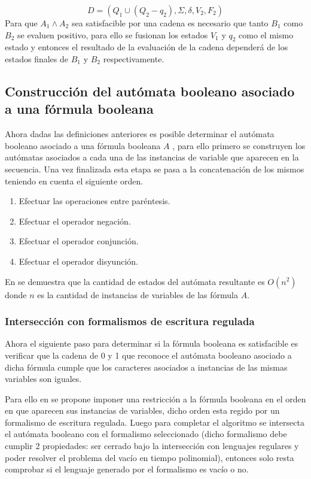 $$
      D=(Q_1\cup (Q_2-q_2),\Sigma,\delta,V_2, F_2)
$$
Para que $A_1 \wedge A_2$ sea satisfacible por una cadena es necesario que tanto $B_1$ como $B_2$ se evaluen positivo, para
ello se fusionan los estados $V_1$ y $q_2$ como el mismo estado y entonces el resultado de la evaluación de la cadena dependerá
de los estados finales de $B_1$ y $B_2$ respectivamente.

\subsection{Construcción del autómata booleano asociado a una fórmula booleana}

Ahora dadas las definiciones anteriores es posible determinar el autómata booleano asociado a una fórmula booleana $A$ \cite{aCFSAT},
para ello primero se construyen los autómatas asociados a cada una de las instancias de variable que
aparecen en la secuencia. Una vez finalizada esta etapa se pasa a la concatenación de los
mismos teniendo en cuenta el siguiente orden.

\begin{enumerate}
      \item Efectuar las operaciones entre paréntesis.
      \item  Efectuar el operador negación.
      \item  Efectuar el operador conjunción.
      \item  Efectuar el operador disyunción.
\end{enumerate}

En \cite{aCFSAT} se demuestra que la cantidad de estados del autómata resultante es $O(n^2)$ donde $n$ es la cantidad de instancias
de variables de las fórmula $A$.

\subsubsection{Intersección con formalismos de escritura regulada}

Ahora el siguiente paso para determinar si la fórmula booleana es satisfacible es verificar
que la cadena de 0 y 1 que reconoce el autómata booleano asociado a dicha fórmula cumple que los caracteres
asociados a instancias de las mismas variables son iguales.

Para ello en \cite{aCFSAT} se propone imponer una restricción a la fórmula booleana en el orden en que aparecen sus
instancias de variables, dicho orden esta regido por un formalismo de escritura regulada. Luego para completar
el algoritmo se intersecta el autómata booleano con el formalismo seleccionado (dicho formalismo debe cumplir 2 propiedades:
ser cerrado bajo la intersección con lenguajes regulares y poder resolver el problema del vacío en tiempo polinomial), entonces
solo resta comprobar si el lenguaje generado por el formalismo es vacío o no.

